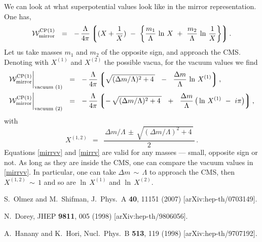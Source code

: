 \documentclass[12pt]{article}
\def\beq{\begin{equation}}
\def\eeq{\end{equation}}
\newcommand{\mc}[1]{\mathcal{#1}}
\newcommand{\lgr}{\left\lgroup}
\newcommand{\rgr}{\right\rgroup}
\begin{document}
	We can look at what superpotential values look like in the mirror representation.
	One has,
\beq
	\mc{W}_\text{mirror}^\text{CP(1)} ~~=~~
		-\, \frac{\Lambda}{4\pi} 
			\lgr  ( X + \frac{1}{X} ) ~-~
			      \left\{ \frac{m_1}{\Lambda}\, \ln\, X ~+~
				      \frac{m_2}{\Lambda}\, \ln\, \frac{1}{X} \right\} \rgr.
\eeq
	Let us take masses $ m_1 $ and $ m_2 $ of the opposite sign, and approach the CMS.
	Denoting with $ X^{(1)} $ and $ X^{(2)} $ the possible vacua, for the vacuum values we find
\begin{align}
%
\label{mirrvv}
	\mc{W}_\text{mirror}^\text{CP(1)}\bigg|_\text{vacuum (1)} & ~~=~~
		-\, \frac{\Lambda}{4\pi} 
			\lgr \sqrt{ (\Delta m / \Lambda)^2 + 4\, } ~~-~~ \frac{\Delta m}{\Lambda}\, \ln\, X^{(1)} \rgr,
	\\
%
\notag
	\mc{W}_\text{mirror}^\text{CP(1)}\bigg|_\text{vacuum (2)} & ~~=~~
		-\, \frac{\Lambda}{4\pi}
			\lgr -\, \sqrt{ (\Delta m / \Lambda)^2 + 4\, } ~~+~~ 
			 \frac{\Delta m}{\Lambda}\, \big(\ln\, X^{(1)} ~-~ i\pi \big) \rgr ,
\end{align}
	with
\beq
\label{mirrv}
	X^{(1,2)} ~~=~~  \frac{\,  \Delta m / \Lambda \,\pm\, \sqrt{ (\Delta m / \Lambda)^2 + 4\, } \,}
                                                      {  2  }\,.
\eeq
	Equations \eqref{mirrvv} and \eqref{mirrv} are valid for any masses --- small, opposite sign or not.
	As long as they are inside the CMS, one can compare the vacuum values in \eqref{mirrvv}.
	In particular, one can take $ \Delta m \,\sim\, \Lambda $ to approach the CMS,
	then $ X^{(1,2)} \,\sim\, 1 $ and so are $ \ln\, X^{(1)} $ and $ \ln\, X^{(2)} $.


\begin{thebibliography}{99}
  S.~Olmez and M.~Shifman,
  J.\ Phys.\ A  {\bf 40}, 11151 (2007)
  [arXiv:hep-th/0703149].

  N.~Dorey,
  JHEP {\bf 9811}, 005 (1998)
  [arXiv:hep-th/9806056].

  A.~Hanany and K.~Hori,
  Nucl.\ Phys.\  B {\bf 513}, 119 (1998)
  [arXiv:hep-th/9707192].

\end{thebibliography}
\end{document}
